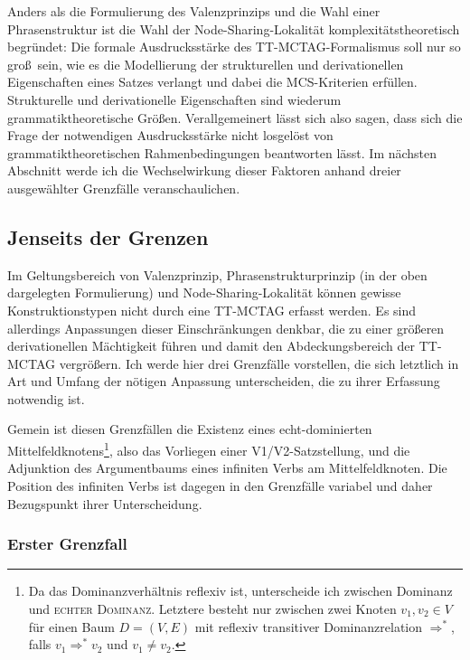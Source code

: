 Anders als die Formulierung des Valenzprinzips und die Wahl einer Phrasenstruktur ist die Wahl der Node-Sharing-Lokalität komplexitätstheoretisch begründet: Die formale Ausdrucksstärke des TT-MCTAG-Formalismus soll nur so gro\ss\ sein, wie es die Modellierung der strukturellen und derivationellen Eigenschaften eines Satzes verlangt und dabei die MCS-Kriterien erfüllen. Strukturelle und derivationelle Eigenschaften sind wiederum grammatiktheoretische Grö\ss en. Verallgemeinert lässt sich also sagen, dass sich die Frage der notwendigen Ausdrucksstärke nicht losgelöst von grammatiktheoretischen Rahmenbedingungen beantworten lässt. Im nächsten Abschnitt werde ich die Wechselwirkung dieser Faktoren anhand dreier ausgewählter Grenzfälle veranschaulichen. 


\subsection{Jenseits der Grenzen}

Im Geltungsbereich von Valenzprinzip, Phrasenstrukturprinzip (in der oben dargelegten Formulierung) und Node-Sharing-Lokalität können gewisse Konstruktionstypen nicht durch eine TT-MCTAG erfasst werden. Es sind allerdings Anpassungen dieser Einschränkungen denkbar, die zu einer größeren derivationellen Mächtigkeit führen und damit den Abdeckungsbereich der TT-MCTAG vergrößern. Ich werde hier drei Grenzfälle vorstellen, die sich letztlich in Art und Umfang der nötigen Anpassung unterscheiden, die zu ihrer Erfassung notwendig ist. 

Gemein ist diesen Grenzfällen die Existenz eines echt-dominierten Mittelfeldknotens\footnote{Da das Dominanzverhältnis reflexiv ist, unterscheide ich zwischen Dominanz und \textsc{echter Dominanz}. Letztere besteht nur zwischen zwei Knoten $v_1, v_2 \in V$ für einen Baum $D = (V,E)$ mit reflexiv transitiver Dominanzrelation $\Rightarrow^*$, falls $v_1 \Rightarrow^* v_2$ und $v_1 \neq v_2$.}, also das Vorliegen einer V1/V2-Satzstellung, und die Adjunktion des Argumentbaums eines infiniten Verbs am Mittelfeldknoten. Die Position des infiniten Verbs ist dagegen in den Grenzfälle variabel und daher Bezugspunkt ihrer Unterscheidung. 

\subsubsection*{Erster Grenzfall}

